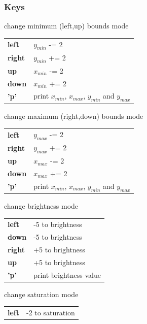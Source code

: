 \subsubsection{Keys}
\label{sec:cgd:howto:keys}
    \begin{description} \itemindent=-15pt
        \item['l'] change minimum (left,up) bounds mode \\
            \begin{tabular}{ll}
                {\bf left } & $y_{min}$ -= 2 \\
                {\bf right} & $y_{min}$ += 2 \\
                {\bf up   } & $x_{min}$ -= 2 \\
                {\bf down } & $x_{min}$ += 2 \\
                {\bf 'p'  } & print $x_{min}$, $x_{max}$, $y_{min}$ and $y_{max}$
            \end{tabular}
        \item['u'] change maximum (right,down) bounds mode \\
            \begin{tabular}{ll}
                {\bf left } & $y_{max}$ -= 2 \\
                {\bf right} & $y_{max}$ += 2 \\
                {\bf up   } & $x_{max}$ -= 2 \\
                {\bf down } & $x_{max}$ += 2 \\
                {\bf 'p'  } & print $x_{min}$, $x_{max}$, $y_{min}$ and $y_{max}$ 
            \end{tabular}
        \item['b']  change brightness mode \\
            \begin{tabular}{ll} 
                {\bf left } & -5 to brightness \\
                {\bf down } & -5 to brightness \\
                {\bf right} & +5 to brightness \\
                {\bf up   } & +5 to brightness \\
                {\bf 'p'  } & print brightness value 
            \end{tabular}
        \item['s'] change saturation mode \\
            \begin{tabular}{ll}
                {\bf left } & -2 to saturation \\

\end{tabular}
\end{description}
